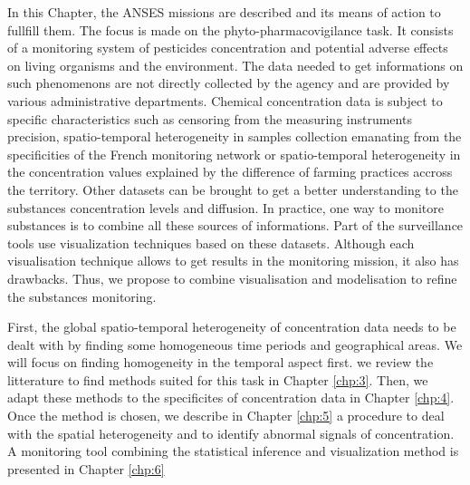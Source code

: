 In this Chapter, the ANSES missions are described and its means of action to fullfill them. The focus is made on the phyto-pharmacovigilance task. It consists of a monitoring system of pesticides concentration and potential adverse effects on living organisms and the environment. The data needed to get informations on such phenomenons are not directly collected by the agency and are provided by various administrative departments. Chemical concentration data is subject to specific characteristics such as censoring from the measuring instruments precision, spatio-temporal heterogeneity in samples collection emanating from the specificities of the French monitoring network or spatio-temporal heterogeneity in the concentration values explained by the difference of farming practices accross the territory. Other datasets can be brought to get a better understanding to the substances concentration levels and diffusion. In practice, one way to monitore substances is to combine all these sources of informations. Part of the surveillance tools use visualization techniques based on these datasets. Although each visualisation technique allows to get results in the monitoring mission, it also has drawbacks. Thus, we propose to combine visualisation and modelisation to refine the substances monitoring. 

First, the global spatio-temporal heterogeneity of concentration data needs to be dealt with by finding some homogeneous time periods and geographical areas. We will focus on finding homogeneity in the temporal aspect first. we review the litterature to find methods suited for this task in Chapter \ref{chp:3}. Then, we adapt these methods to the specificites of concentration data in Chapter \ref{chp:4}. Once the method is chosen, we describe in Chapter \ref{chp:5} a procedure to deal with the spatial heterogeneity and to identify abnormal signals of concentration. A monitoring tool combining the statistical inference and visualization method is presented in Chapter \ref{chp:6}     




 
 


